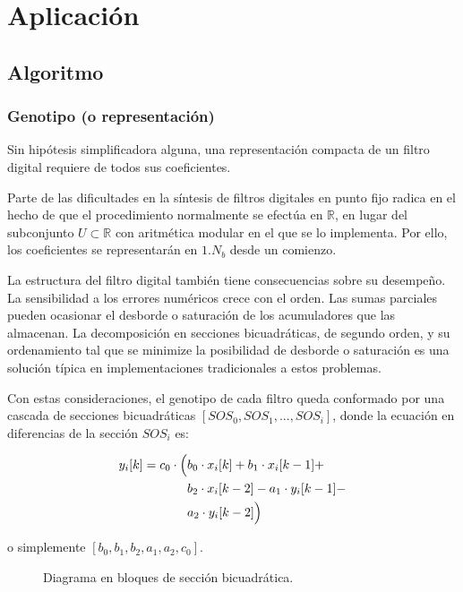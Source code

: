 \documentclass[11pt, journal]{IEEEtran}
\begin{document}
\section{Aplicación}

\subsection{Algoritmo}

\subsubsection{Genotipo (o representación)}

Sin hipótesis simplificadora alguna, una representación compacta de un
filtro digital requiere de todos sus coeficientes.

Parte de las dificultades en la síntesis de filtros digitales en punto
fijo radica en el hecho de que el procedimiento normalmente se efectúa
en \(\mathbb{R}\), en lugar del subconjunto \(U \subset \mathbb{R}\) con
aritmética modular en el que se lo implementa. Por ello, los
coeficientes se representarán en \(1.N_b\) desde un comienzo.

La estructura del filtro digital también tiene consecuencias sobre su
desempeño. La sensibilidad a los errores numéricos crece con el orden.
Las sumas parciales pueden ocasionar el desborde o saturación de los
acumuladores que las almacenan. La decomposición en secciones
bicuadráticas, de segundo orden, y su ordenamiento tal que se minimize
la posibilidad de desborde o saturación es una solución típica en
implementaciones tradicionales a estos problemas.

Con estas consideraciones, el genotipo de cada filtro queda conformado
por una cascada de secciones bicuadráticas
\([SOS_0, SOS_1, ..., SOS_i]\), donde la ecuación en diferencias de la
sección \(SOS_i\) es:

\begin{align*}
y_i[k] = c_0 \cdot \Bigl(&b_0 \cdot x_i[k] + b_1 \cdot x_i[k-1] + \\
                         &b_2 \cdot x_i[k-2] - a_1 \cdot y_i[k-1] - \\
                         &a_2 \cdot y_i[k-2] \Bigr)
\end{align*}

o simplemente \([b_0, b_1, b_2, a_1, a_2, c_0]\).

\begin{figure}
  \centering
  \caption{Diagrama en bloques de sección bicuadrática.}
\end{figure}
\end{document}
